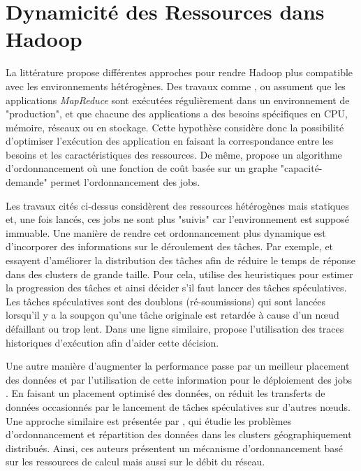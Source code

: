 \section{Dynamicité des Ressources dans Hadoop} \label{sec:related}

La littérature propose différentes approches pour rendre Hadoop plus compatible avec les environnements hétérogènes. Des travaux comme \cite{Kumar2012}, \cite{Tian2009} ou \cite{Rasooli2012} assument que les applications \textit{MapReduce} sont exécutées régulièrement dans un environnement de "production", et que chacune des applications a des besoins spécifiques en CPU, mémoire, réseaux ou en stockage. Cette hypothèse considère donc la possibilité d'optimiser l'exécution des application en faisant la correspondance entre les besoins et les caractéristiques des ressources. De même, \cite{Isard2009} propose un algorithme d'ordonnancement où une fonction de coût basée sur un graphe "capacité-demande" permet l'ordonnancement des jobs.

Les travaux cités ci-dessus considèrent des ressources hétérogènes mais statiques et, une fois lancés, ces jobs ne sont plus "suivis" car l'environnement est supposé immuable. Une manière de rendre cet ordonnancement plus dynamique est d'incorporer des informations sur le déroulement des tâches. Par exemple, \cite{Zaharia2008} et \cite{Chen} essayent d'améliorer la distribution des tâches afin de réduire le temps de réponse dans des clusters de grande taille. Pour cela, \cite{Zaharia2008} utilise des heuristiques pour estimer la progression des tâches et ainsi décider s'il faut lancer des tâches spéculatives. Les tâches spéculatives sont des doublons (ré-soumissions) qui sont lancées lorsqu'il y a la soupçon qu'une tâche originale est retardée à cause d'un n{\oe}ud défaillant ou trop lent. Dans une ligne similaire, \cite{Chen} propose l'utilisation des traces historiques d'exécution afin d'aider cette décision. 


Une autre manière d'augmenter la performance passe par un meilleur placement des données et par l'utilisation de cette information pour le déploiement des jobs \cite{Xie2010}. En faisant un placement optimisé des données, on réduit les transferts de données occasionnés par le lancement de tâches spéculatives sur d'autres n{\oe}uds. Une approche similaire est présentée par \cite{Cavallo2015}, qui étudie les problèmes d'ordonnancement et répartition des données dans les clusters géographiquement distribués. Ainsi, ces auteurs présentent un mécanisme d'ordonnancement basé sur les ressources de calcul mais aussi sur le débit du réseau.  

